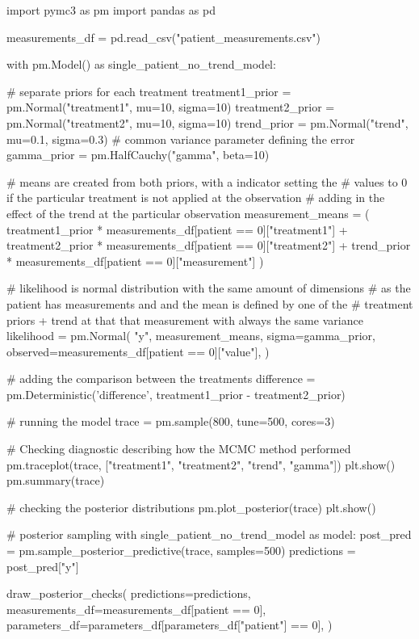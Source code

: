 \documentclass[12pt,a4paper,leqno]{report}
\theoremstyle{plain}
\theoremstyle{definition}
\theoremstyle{remark}
\begin{document}
\begin{pyverbatim}
import pymc3 as pm
import pandas as pd

measurements_df = pd.read_csv("patient_measurements.csv")
   
with pm.Model() as single_patient_no_trend_model:

    # separate priors for each treatment
    treatment1_prior = pm.Normal("treatment1", mu=10, sigma=10)
    treatment2_prior = pm.Normal("treatment2", mu=10, sigma=10)
    trend_prior = pm.Normal("trend", mu=0.1, sigma=0.3)
    # common variance parameter defining the error
    gamma_prior = pm.HalfCauchy("gamma", beta=10)

    # means are created from both priors, with a indicator setting the
    # values to 0 if the particular treatment is not applied at the observation
    # adding in the effect of the trend at the particular observation
    measurement_means = (
        treatment1_prior * measurements_df[patient == 0]["treatment1"]
        + treatment2_prior * measurements_df[patient == 0]["treatment2"]
        + trend_prior * measurements_df[patient == 0]["measurement"]
    )

    # likelihood is normal distribution with the same amount of dimensions
    # as the patient has measurements and and the mean is defined by one of the
    # treatment priors + trend at that that measurement with always the same variance
    likelihood = pm.Normal(
        "y",
        measurement_means,
        sigma=gamma_prior,
        observed=measurements_df[patient == 0]["value"],
    )

    # adding the comparison between the treatments
    difference = pm.Deterministic('difference', treatment1_prior - treatment2_prior)

    # running the model
    trace = pm.sample(800, tune=500, cores=3)

    # Checking diagnostic describing how the MCMC method performed
    pm.traceplot(trace, ["treatment1", "treatment2", "trend", "gamma"])
    plt.show()
    pm.summary(trace)

    # checking the posterior distributions
    pm.plot_posterior(trace)
    plt.show()

 
# posterior sampling
with single_patient_no_trend_model as model:
    post_pred = pm.sample_posterior_predictive(trace, samples=500)
    predictions = post_pred["y"]

draw_posterior_checks(
    predictions=predictions,
    measurements_df=measurements_df[patient == 0],
    parameters_df=parameters_df[parameters_df["patient"] == 0],
)
\end{pyverbatim}
\end{document}
